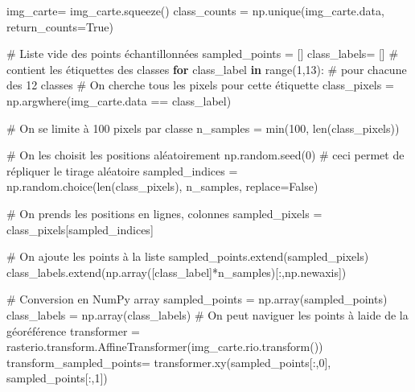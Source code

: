 \documentclass[
  11pt,
  letterpaper,
  open=any,
  twoside=false,
  french]{scrbook}
\newenvironment{Shaded}{\begin{snugshade}}{\end{snugshade}}
\newcommand{\BuiltInTok}[1]{\textcolor[rgb]{0.00,0.23,0.31}{#1}}
\newcommand{\CommentTok}[1]{\textcolor[rgb]{0.37,0.37,0.37}{#1}}
\newcommand{\ControlFlowTok}[1]{\textcolor[rgb]{0.00,0.23,0.31}{\textbf{#1}}}
\newcommand{\DecValTok}[1]{\textcolor[rgb]{0.68,0.00,0.00}{#1}}
\newcommand{\KeywordTok}[1]{\textcolor[rgb]{0.00,0.23,0.31}{\textbf{#1}}}
\newcommand{\NormalTok}[1]{\textcolor[rgb]{0.00,0.23,0.31}{#1}}
\newcommand{\OperatorTok}[1]{\textcolor[rgb]{0.37,0.37,0.37}{#1}}
\newcommand{\VariableTok}[1]{\textcolor[rgb]{0.07,0.07,0.07}{#1}}
\begin{document}
\begin{Shaded}
\begin{Highlighting}[]
\NormalTok{img\_carte}\OperatorTok{=}\NormalTok{ img\_carte.squeeze()}
\NormalTok{class\_counts }\OperatorTok{=}\NormalTok{ np.unique(img\_carte.data, return\_counts}\OperatorTok{=}\VariableTok{True}\NormalTok{)}

\CommentTok{\# Liste vide des points échantillonnées}
\NormalTok{sampled\_points }\OperatorTok{=}\NormalTok{ []}
\NormalTok{class\_labels}\OperatorTok{=}\NormalTok{ [] }\CommentTok{\# contient les étiquettes des classes}
\ControlFlowTok{for}\NormalTok{ class\_label }\KeywordTok{in} \BuiltInTok{range}\NormalTok{(}\DecValTok{1}\NormalTok{,}\DecValTok{13}\NormalTok{): }\CommentTok{\# pour chacune des 12 classes}
  \CommentTok{\# On cherche tous les pixels pour cette étiquette}
\NormalTok{  class\_pixels }\OperatorTok{=}\NormalTok{ np.argwhere(img\_carte.data }\OperatorTok{==}\NormalTok{ class\_label)}

  \CommentTok{\# On se limite à 100 pixels par classe}
\NormalTok{  n\_samples }\OperatorTok{=} \BuiltInTok{min}\NormalTok{(}\DecValTok{100}\NormalTok{, }\BuiltInTok{len}\NormalTok{(class\_pixels))}

  \CommentTok{\# On les choisit les positions aléatoirement}
\NormalTok{  np.random.seed(}\DecValTok{0}\NormalTok{) }\CommentTok{\# ceci permet de répliquer le tirage aléatoire}
\NormalTok{  sampled\_indices }\OperatorTok{=}\NormalTok{ np.random.choice(}\BuiltInTok{len}\NormalTok{(class\_pixels), n\_samples, replace}\OperatorTok{=}\VariableTok{False}\NormalTok{)}

  \CommentTok{\# On prends les positions en lignes, colonnes}
\NormalTok{  sampled\_pixels }\OperatorTok{=}\NormalTok{ class\_pixels[sampled\_indices]}

  \CommentTok{\# On ajoute les points à la liste}
\NormalTok{  sampled\_points.extend(sampled\_pixels)}
\NormalTok{  class\_labels.extend(np.array([class\_label]}\OperatorTok{*}\NormalTok{n\_samples)[:,np.newaxis])}

\CommentTok{\# Conversion en NumPy array}
\NormalTok{sampled\_points }\OperatorTok{=}\NormalTok{ np.array(sampled\_points)}
\NormalTok{class\_labels }\OperatorTok{=}\NormalTok{ np.array(class\_labels)}
\CommentTok{\# On peut naviguer les points à l\textquotesingle{}aide de la géoréférence}
\NormalTok{transformer }\OperatorTok{=}\NormalTok{ rasterio.transform.AffineTransformer(img\_carte.rio.transform())}
\NormalTok{transform\_sampled\_points}\OperatorTok{=}\NormalTok{ transformer.xy(sampled\_points[:,}\DecValTok{0}\NormalTok{], sampled\_points[:,}\DecValTok{1}\NormalTok{])}


\end{Highlighting}
\end{Shaded}
\end{document}
